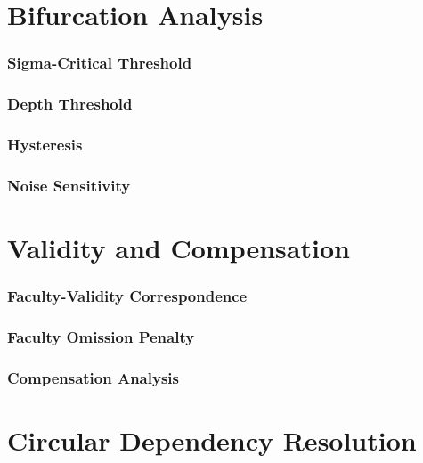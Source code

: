 \documentclass[11pt,a4paper]{article}
\begin{document}
\part{Bifurcation Analysis}

\section{Sigma-Critical Threshold}


\section{Depth Threshold}


\section{Hysteresis}


\section{Noise Sensitivity}


\part{Validity and Compensation}

\section{Faculty-Validity Correspondence}


\section{Faculty Omission Penalty}


\section{Compensation Analysis}


\part{Circular Dependency Resolution}
\end{document}
